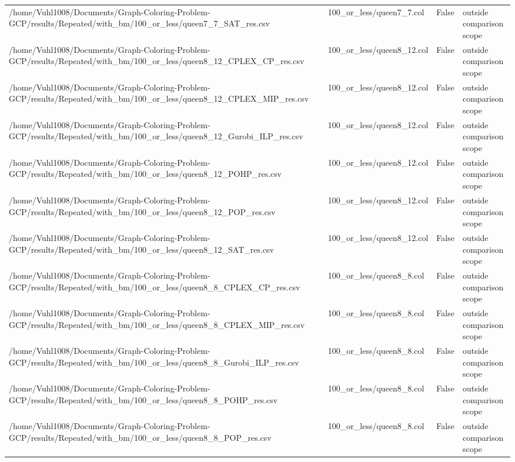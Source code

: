 \begin{table}[htbp]
\begin{tabular}{llll}
/home/Vuhl1008/Documents/Graph-Coloring-Problem-GCP/results/Repeated/with\_bm/100\_or\_less/queen7\_7\_SAT\_res.csv & 100\_or\_less/queen7\_7.col & False & outside comparison scope \\
/home/Vuhl1008/Documents/Graph-Coloring-Problem-GCP/results/Repeated/with\_bm/100\_or\_less/queen8\_12\_CPLEX\_CP\_res.csv & 100\_or\_less/queen8\_12.col & False & outside comparison scope \\
/home/Vuhl1008/Documents/Graph-Coloring-Problem-GCP/results/Repeated/with\_bm/100\_or\_less/queen8\_12\_CPLEX\_MIP\_res.csv & 100\_or\_less/queen8\_12.col & False & outside comparison scope \\
/home/Vuhl1008/Documents/Graph-Coloring-Problem-GCP/results/Repeated/with\_bm/100\_or\_less/queen8\_12\_Gurobi\_ILP\_res.csv & 100\_or\_less/queen8\_12.col & False & outside comparison scope \\
/home/Vuhl1008/Documents/Graph-Coloring-Problem-GCP/results/Repeated/with\_bm/100\_or\_less/queen8\_12\_POHP\_res.csv & 100\_or\_less/queen8\_12.col & False & outside comparison scope \\
/home/Vuhl1008/Documents/Graph-Coloring-Problem-GCP/results/Repeated/with\_bm/100\_or\_less/queen8\_12\_POP\_res.csv & 100\_or\_less/queen8\_12.col & False & outside comparison scope \\
/home/Vuhl1008/Documents/Graph-Coloring-Problem-GCP/results/Repeated/with\_bm/100\_or\_less/queen8\_12\_SAT\_res.csv & 100\_or\_less/queen8\_12.col & False & outside comparison scope \\
/home/Vuhl1008/Documents/Graph-Coloring-Problem-GCP/results/Repeated/with\_bm/100\_or\_less/queen8\_8\_CPLEX\_CP\_res.csv & 100\_or\_less/queen8\_8.col & False & outside comparison scope \\
/home/Vuhl1008/Documents/Graph-Coloring-Problem-GCP/results/Repeated/with\_bm/100\_or\_less/queen8\_8\_CPLEX\_MIP\_res.csv & 100\_or\_less/queen8\_8.col & False & outside comparison scope \\
/home/Vuhl1008/Documents/Graph-Coloring-Problem-GCP/results/Repeated/with\_bm/100\_or\_less/queen8\_8\_Gurobi\_ILP\_res.csv & 100\_or\_less/queen8\_8.col & False & outside comparison scope \\
/home/Vuhl1008/Documents/Graph-Coloring-Problem-GCP/results/Repeated/with\_bm/100\_or\_less/queen8\_8\_POHP\_res.csv & 100\_or\_less/queen8\_8.col & False & outside comparison scope \\
/home/Vuhl1008/Documents/Graph-Coloring-Problem-GCP/results/Repeated/with\_bm/100\_or\_less/queen8\_8\_POP\_res.csv & 100\_or\_less/queen8\_8.col & False & outside comparison scope \\

\end{tabular}
\end{table}

